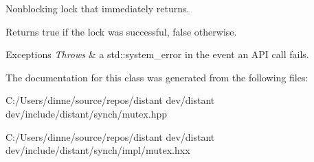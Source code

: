 Nonblocking lock that immediately returns. 

\begin{DoxyReturn}{Returns}
true if the lock was successful, false otherwise. 
\end{DoxyReturn}

\begin{DoxyExceptions}{Exceptions}
{\em Throws} & a std\+::system\+\_\+error in the event an A\+PI call fails. \\
\hline
\end{DoxyExceptions}


The documentation for this class was generated from the following files\+:\begin{DoxyCompactItemize}
\item 
C\+:/\+Users/dinne/source/repos/distant dev/distant dev/include/distant/synch/mutex.\+hpp\item 
C\+:/\+Users/dinne/source/repos/distant dev/distant dev/include/distant/synch/impl/mutex.\+hxx\end{DoxyCompactItemize}

